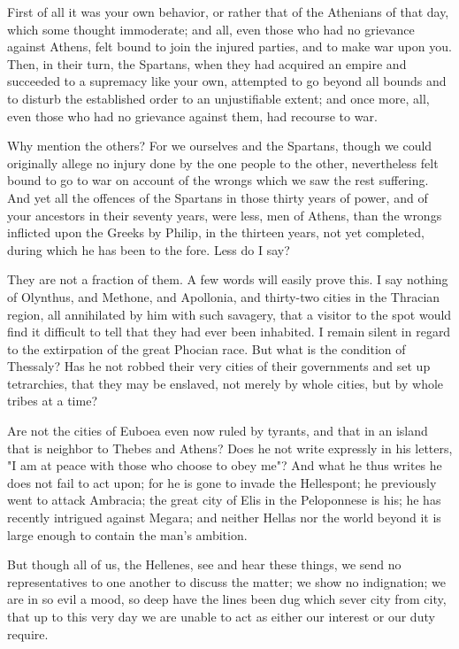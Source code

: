 \documentclass[a4paper]{amsbook}
\begin{document}
First of all it was your own behavior, or rather that of the Athenians of that day, which some thought immoderate; and all, even those who had no grievance against Athens, felt bound to join the injured parties, and to make war upon you. Then, in their turn, the Spartans, when they had acquired an empire and succeeded to a supremacy like your own, attempted to go beyond all bounds and to disturb the established order to an unjustifiable extent; and once more, all, even those who had no grievance against them, had recourse to war.

Why mention the others? For we ourselves and the Spartans, though we could originally allege no injury done by the one people to the other, nevertheless felt bound to go to war on account of the wrongs which we saw the rest suffering. And yet all the offences of the Spartans in those thirty years of power, and of your ancestors in their seventy years, were less, men of Athens, than the wrongs inflicted upon the Greeks by Philip, in the thirteen years, not yet completed, during which he has been to the fore. Less do I say?

They are not a fraction of them. A few words will easily prove this. I say nothing of Olynthus, and Methone, and Apollonia, and thirty-two cities in the Thracian region, all annihilated by him with such savagery, that a visitor to the spot would find it difficult to tell that they had ever been inhabited. I remain silent in regard to the extirpation of the great Phocian race. But what is the condition of Thessaly? Has he not robbed their very cities of their governments and set up tetrarchies, that they may be enslaved, not merely by whole cities, but by whole tribes at a time?

Are not the cities of Euboea even now ruled by tyrants, and that in an island that is neighbor to Thebes and Athens? Does he not write expressly in his letters, "I am at peace with those who choose to obey me"? And what he thus writes he does not fail to act upon; for he is gone to invade the Hellespont; he previously went to attack Ambracia; the great city of Elis in the Peloponnese is his; he has recently intrigued against Megara; and neither Hellas nor the world beyond it is large enough to contain the man's ambition.

But though all of us, the Hellenes, see and hear these things, we send no representatives to one another to discuss the matter; we show no indignation; we are in so evil a mood, so deep have the lines been dug which sever city from city, that up to this very day we are unable to act as either our interest or our duty require.
\end{document}
